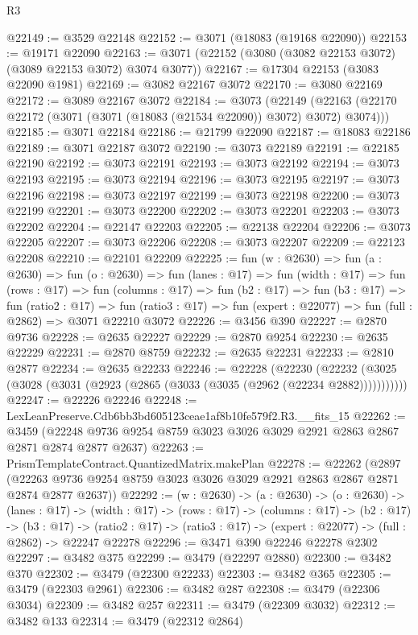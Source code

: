 \begin{lexlean}{R3}
\begin{coremodule}
@22149 := @3529 @22148
@22152 := @3071 (@18083 (@19168 @22090))
@22153 := @19171 @22090
@22163 := @3071 (@22152 (@3080 (@3082 @22153 @3072) (@3089 @22153 @3072) @3074 @3077))
@22167 := @17304 @22153 (@3083 @22090 @1981)
@22169 := @3082 @22167 @3072
@22170 := @3080 @22169
@22172 := @3089 @22167 @3072
@22184 := @3073
    (@22149 (@22163 (@22170 @22172 (@3071 (@3071 (@18083 (@21534 @22090)) @3072) @3072) @3074)))
@22185 := @3071 @22184
@22186 := @21799 @22090
@22187 := @18083 @22186
@22189 := @3071 @22187 @3072
@22190 := @3073 @22189
@22191 := @22185 @22190
@22192 := @3073 @22191
@22193 := @3073 @22192
@22194 := @3073 @22193
@22195 := @3073 @22194
@22196 := @3073 @22195
@22197 := @3073 @22196
@22198 := @3073 @22197
@22199 := @3073 @22198
@22200 := @3073 @22199
@22201 := @3073 @22200
@22202 := @3073 @22201
@22203 := @3073 @22202
@22204 := @22147 @22203
@22205 := @22138 @22204
@22206 := @3073 @22205
@22207 := @3073 @22206
@22208 := @3073 @22207
@22209 := @22123 @22208
@22210 := @22101 @22209
@22225 := fun (w : @2630) =>
  fun (a : @2630) =>
  fun (o : @2630) =>
  fun (lanes : @17) =>
  fun (width : @17) =>
  fun (rows : @17) =>
  fun (columns : @17) =>
  fun (b2 : @17) =>
  fun (b3 : @17) =>
  fun (ratio2 : @17) =>
  fun (ratio3 : @17) => fun (expert : @22077) => fun (full : @2862) => @3071 @22210 @3072
@22226 := @3456 @390
@22227 := @2870 @9736
@22228 := @2635 @22227
@22229 := @2870 @9254
@22230 := @2635 @22229
@22231 := @2870 @8759
@22232 := @2635 @22231
@22233 := @2810 @2877
@22234 := @2635 @22233
@22246 := @22228
    (@22230 (@22232 (@3025 (@3028 (@3031 (@2923 (@2865 (@3033 (@3035 (@2962 (@22234 @2882)))))))))))
@22247 := @22226 @22246
@22248 := LexLeanPreserve.Cdb6bb3bd605123ceae1af8b10fe579f2.R3.__fits_15
@22262 := @3459
    (@22248 @9736 @9254 @8759 @3023 @3026 @3029 @2921 @2863 @2867 @2871 @2874 @2877 @2637)
@22263 := PrismTemplateContract.QuantizedMatrix.makePlan
@22278 := @22262
    (@2897 (@22263 @9736 @9254 @8759 @3023 @3026 @3029 @2921 @2863 @2867 @2871 @2874 @2877 @2637))
@22292 := (w : @2630) ->
  (a : @2630) ->
  (o : @2630) ->
  (lanes : @17) ->
  (width : @17) ->
  (rows : @17) ->
  (columns : @17) ->
  (b2 : @17) ->
  (b3 : @17) ->
  (ratio2 : @17) -> (ratio3 : @17) -> (expert : @22077) -> (full : @2862) -> @22247 @22278
@22296 := @3471 @390 @22246 @22278 @2302
@22297 := @3482 @375
@22299 := @3479 (@22297 @2880)
@22300 := @3482 @370
@22302 := @3479 (@22300 @22233)
@22303 := @3482 @365
@22305 := @3479 (@22303 @2961)
@22306 := @3482 @287
@22308 := @3479 (@22306 @3034)
@22309 := @3482 @257
@22311 := @3479 (@22309 @3032)
@22312 := @3482 @133
@22314 := @3479 (@22312 @2864)

\end{coremodule}
\end{lexlean}
